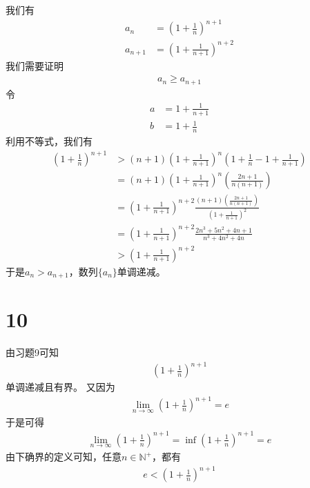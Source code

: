 \documentclass{article}
\begin{document}
我们有
\begin{align*}
  a_{n}     & = \left(1 + \frac{1}{n}\right)^{n + 1}    \\
  a_{n + 1} & = \left(1 + \frac{1}{n +1}\right)^{n + 2}
\end{align*}
我们需要证明
\begin{align*}
  a_n \geq a_{n + 1}
\end{align*}
令
\begin{align*}
  a & = 1 + \frac{1}{n +1} \\
  b & = 1 + \frac{1}{n}
\end{align*}
利用不等式，我们有
\begin{align*}
  \left(1 + \frac{1}{n}\right)^{n + 1}
   & > (n+1)\left(1 + \frac{1}{n +1}\right)^n \left(1 + \frac{1}{n} - 1 + \frac{1}{n +1}\right)                                     \\
   & = (n+1)\left(1 + \frac{1}{n +1}\right)^n \left(\frac{2n + 1}{n(n +1)}\right)                                                   \\
   & = \left(1 + \frac{1}{n +1}\right)^{n + 2} \frac{(n + 1)\left(\frac{2n + 1}{n(n +1)}\right)}{\left(1 + \frac{1}{n +1}\right)^2} \\
   & = \left(1 + \frac{1}{n +1}\right)^{n + 2}  \frac{2n^3 + 5n^2 + 4n + 1}{n^3 + 4n^2 + 4n}                                        \\
   & > \left(1 + \frac{1}{n +1}\right)^{n + 2}
\end{align*}
于是$a_n > a_{n + 1}$，数列$\{a_n\}$单调递减。

\section*{10}

由习题9可知
\begin{align*}
  (1 + \frac{1}{n})^{n + 1}
\end{align*}
单调递减且有界。
又因为
\begin{align*}
  \lim\limits_{n \to \infty} (1 + \frac{1}{n})^{n + 1} = e
\end{align*}
于是可得
\begin{align*}
  \lim\limits_{n \to \infty} (1 + \frac{1}{n})^{n + 1} = \inf{(1 + \frac{1}{n})^{n + 1}} = e
\end{align*}
由下确界的定义可知，任意$n \in \mathbb{N}^+$，都有
\begin{align*}
  e < (1 + \frac{1}{n})^{n + 1}
\end{align*}
\end{document}
